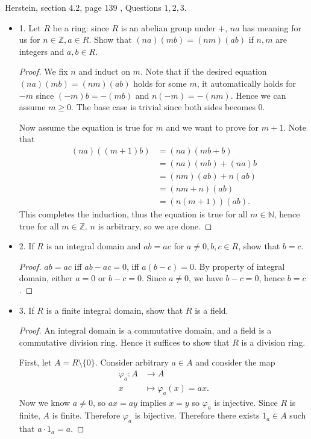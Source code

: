 Herstein, section $4.2$, page 139 , Questions $1,2,3$.
\begin{itemize}[resume]
	\item 1. Let $R$ be a ring: since $R$ is an abelian group under $+$, $na$ has meaning for us for $n \in \mathbb{Z}, a \in R$. Show that $(n a)(m b)=(n m)(a b)$ if $n, m$ are integers and $a, b \in R$.
\begin{proof}
	We fix $n$ and induct on $m$. Note that if the desired equation $(na)(mb) = (nm)(ab)$ holds for some $m$, it automatically holds for $-m$ since $(-m)b = -(mb)$ and $n(-m) = -(nm)$. Hence we can assume $m\ge 0$. The base case is trivial since both sides becomes $0$.

	Now assume the equation is true for $m$ and we want to prove for $m+1$. Note that
	\begin{align*}
		(na)((m+1)b) &= (na)(mb +b) \\
			     &= (na)(mb) + (na)b \\
			     &= (nm)(ab) + n(ab) \\
			     &= (nm+n)(ab) \\
			     &= (n(m+1))(ab)
	.\end{align*} 
	This completes the induction, thus the equation is true for all $m \in \mathbb{N}$, hence true for all $m \in \mathbb{Z}$. $n$ is arbitrary, so we are done.
\end{proof}

	\item 2. If $R$ is an integral domain and $a b=a c$ for $a \neq 0, b, c \in R$, show that $b=c$.
\begin{proof}
	$ab=ac $ iff $ab-ac = 0$, iff $a(b-c) = 0$. By property of integral domain, either $a=0$ or $b-c = 0$. Since $a\neq 0$, we have $b-c=0$, hence $b=c$.
\end{proof}

	\item 3. If $R$ is a finite integral domain, show that $R$ is a field.
\begin{proof}
	An integral domain is a commutative domain, and a field is a commutative division ring. Hence it suffices to show that $R$ is a division ring.

	First, let $A = R \setminus  \{0\} $. Consider arbitrary $a \in A$ and consider the map
	\begin{align*}
		\varphi_a: A &\longrightarrow A \\
		x &\longmapsto \varphi_a(x) = ax
	.\end{align*}
	Now we know $a\neq 0$, so $ax = ay$ implies $x=y$ so $\varphi_a$ is injective. Since $R$ is finite, $A$ is finite. Therefore $\varphi_a$ is bijective. Therefore there exists  $1_a \in A$ such that $a \cdot 1_a = a$.  


\end{proof}
\end{itemize}
